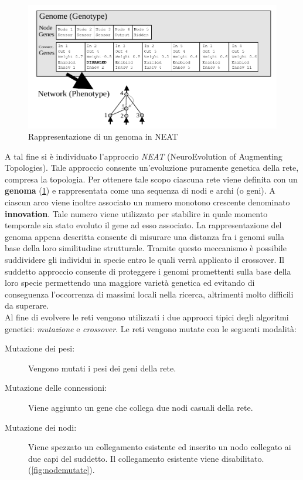 \begin{figure}
	\includegraphics[width=\textwidth]{img/neat-genome.png}
	\caption{Rappresentazione di un genoma in NEAT \cite{stanley2002evolving}}
	\label{fig:neatgenome}
\end{figure}
A tal fine si è individuato l'approccio \emph{NEAT}
(NeuroEvolution of Augmenting Topologies)\cite{stanley2002evolving}. Tale
approccio consente un'evoluzione puramente genetica della rete, compresa la
topologia. Per ottenere tale scopo ciascuna rete viene definita con un
\textbf{genoma} (\cref{fig:neatgenome}) e rappresentata come una sequenza di
nodi e archi (o geni).
A ciascun arco viene inoltre associato un numero monotono crescente denominato
\textbf{innovation}. Tale numero viene utilizzato per stabilire in quale momento
temporale sia stato evoluto il gene ad esso associato. La rappresentazione del
genoma appena descritta consente di misurare una distanza fra i genomi sulla
base della loro similitudine strutturale. Tramite questo meccanismo è possibile
suddividere gli individui in specie entro le quali verrà applicato il crossover.
Il suddetto approccio consente di proteggere i genomi promettenti sulla base
della loro specie permettendo una maggiore varietà genetica ed evitando di
conseguenza l'occorrenza di massimi locali nella ricerca, altrimenti molto
difficili da superare.\\

Al fine di evolvere le reti vengono utilizzati i due approcci tipici degli
algoritmi genetici: \emph{mutazione} e \emph{crossover}.
Le reti vengono mutate con le seguenti modalità:
\begin{description}
	\item[Mutazione dei pesi:] Vengono mutati i pesi dei geni della rete.
	\item[Mutazione delle connessioni:] Viene aggiunto un gene che collega
	due nodi casuali della rete.
	\item[Mutazione dei nodi:] Viene spezzato un collegamento esistente ed
	inserito un nodo collegato ai due capi del suddetto. Il collegamento 
	esistente viene disabilitato.
	(\cref{fig:nodemutate}).
\end{description}

